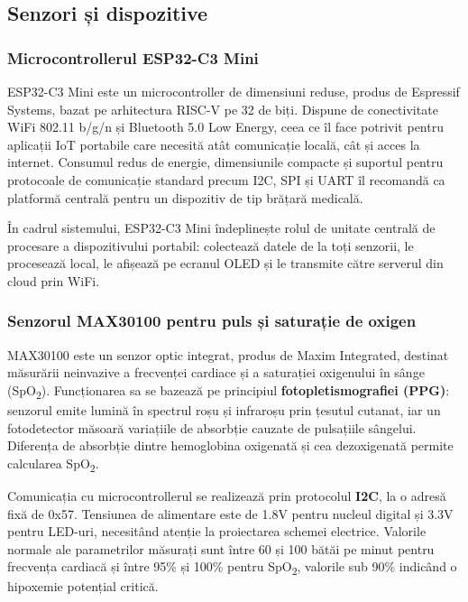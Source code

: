 \documentclass[12pt,a4paper,twoside]{article}
\newcommand{\spo}{SpO\textsubscript{2}}
\begin{document}
\subsection{Senzori și dispozitive}

\subsubsection{Microcontrollerul ESP32-C3 Mini}

ESP32-C3 Mini este un microcontroller de dimensiuni reduse, produs de Espressif Systems, bazat pe arhitectura RISC-V pe 32 de biți. Dispune de conectivitate WiFi 802.11 b/g/n și Bluetooth 5.0 Low Energy, ceea ce îl face potrivit pentru aplicații IoT portabile care necesită atât comunicație locală, cât și acces la internet. Consumul redus de energie, dimensiunile compacte și suportul pentru protocoale de comunicație standard precum I2C, SPI și UART îl recomandă ca platformă centrală pentru un dispozitiv de tip brățară medicală.

În cadrul sistemului, ESP32-C3 Mini îndeplinește rolul de unitate centrală de procesare a dispozitivului portabil: colectează datele de la toți senzorii, le procesează local, le afișează pe ecranul OLED și le transmite către serverul din cloud prin WiFi.

\subsubsection{Senzorul MAX30100 pentru puls și saturație de oxigen}

MAX30100 este un senzor optic integrat, produs de Maxim Integrated, destinat măsurării neinvazive a frecvenței cardiace și a saturației oxigenului în sânge (\spo). Funcționarea sa se bazează pe principiul \textbf{fotopletismografiei (PPG)}: senzorul emite lumină în spectrul roșu și infraroșu prin țesutul cutanat, iar un fotodetector măsoară variațiile de absorbție cauzate de pulsațiile sângelui. Diferența de absorbție dintre hemoglobina oxigenată și cea dezoxigenată permite calcularea \spo.

Comunicația cu microcontrollerul se realizează prin protocolul \textbf{I2C}, la o adresă fixă de 0x57. Tensiunea de alimentare este de 1.8V pentru nucleul digital și 3.3V pentru LED-uri, necesitând atenție la proiectarea schemei electrice. Valorile normale ale parametrilor măsurați sunt între 60 și 100 bătăi pe minut pentru frecvența cardiacă și între 95\% și 100\% pentru \spo, valorile sub 90\% indicând o hipoxemie potențial critică.
\end{document}
